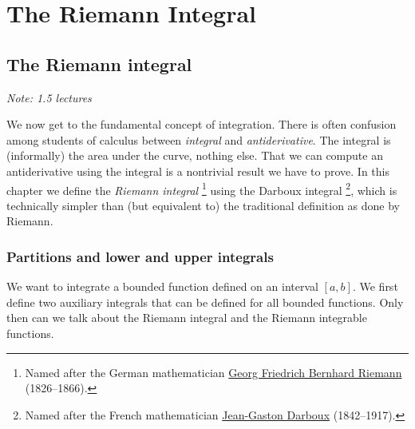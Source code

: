 \documentclass[12pt]{book}
\newcommand{\sectionnotes}[1]{\noindent \emph{Note: #1} \medskip \par}
\theoremstyle{plain}
\theoremstyle{remark}
\theoremstyle{definition}
\theoremstyle{exercise}
\theoremstyle{example}
\begin{document}

\chapter{The Riemann Integral} \label{int:chapter}


\section{The Riemann integral}
\label{sec:rint}

\sectionnotes{1.5 lectures}

We now get to the fundamental concept of integration.  There is
often confusion among students of
calculus between \emph{integral} and \emph{antiderivative}.
The integral is (informally) the area under the curve, nothing else.
That we can compute an antiderivative using the integral is a nontrivial
result we have to prove.  
In this chapter we define the \emph{Riemann integral}%
\footnote{Named after the German mathematician
\href{http://en.wikipedia.org/wiki/Riemann}{Georg Friedrich Bernhard Riemann}
(1826--1866).}
using the Darboux integral%
\footnote{Named after the French mathematician
\href{http://en.wikipedia.org/wiki/Darboux}{Jean-Gaston Darboux} (1842--1917).},
which is technically simpler than (but equivalent to) the traditional
definition as done by Riemann.

\subsection{Partitions and lower and upper integrals}

We want to integrate a bounded function defined on an interval $[a,b]$.
We first define two auxiliary integrals that can be defined for all
bounded functions.  Only then can we talk about the Riemann integral and
the Riemann integrable functions.
\end{document}
